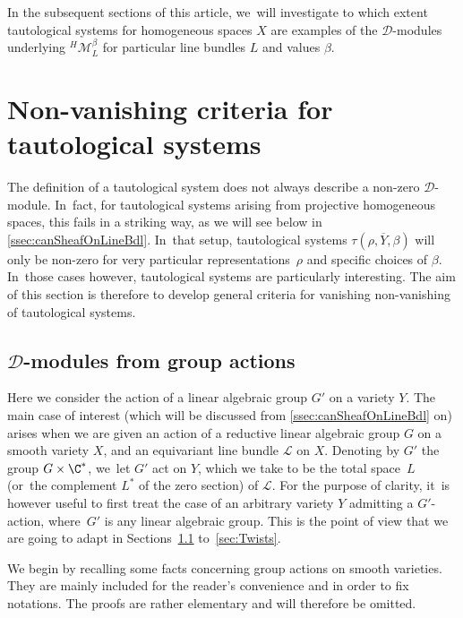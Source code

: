 \documentclass[JEP,XML,SOM,Unicode,published]{cedram}
\begin{document}
In the subsequent sections of this article, we~will investigate to which extent tautological systems for homogeneous spaces $X$ are examples of the $\mathscr D$\nobreakdash-mod\-ules underlying ${}^{H\!}\mathcal M_L^\beta$ for particular line bundles $L$ and values $\beta$.

\section{Non-vanishing criteria for tautological systems} \label{sec:nonVanishingCriteria}

The definition of a tautological system does not always describe a non-zero $\mathscr D$\nobreakdash-mod\-ule. In~fact, for tautological systems arising from projective homogeneous spaces, this fails in a striking way, as we will see below in \cref{ssec:canSheafOnLineBdl}. In~that setup, tautological systems $\tau(\rho,\overline{Y},\beta)$ will only be non-zero for very particular representations~$\rho$ and specific choices of $\beta$. In~those cases however, tautological systems are particularly interesting.
The aim of this section is therefore to develop general criteria for vanishing \resp non-vanishing of tautological systems.

\subsection{\texorpdfstring{$\mathscr D$}{D}-modules from group actions} \label{ssec:VFfromGroupActions}

Here we consider the action of a linear algebraic group $G'$ on a variety $Y$.
The main case of interest (which will be discussed from \cref{ssec:canSheafOnLineBdl} on)
arises when we are given an action of a reductive linear algebraic group $G$ on a smooth variety $X$, and an equivariant line bundle $\mathscr{L}$ on $X$. Denoting by $G'$ the group $G \times \C^*$, we~let $G'$ act on $Y$, which we take to be the total space~$L$ (or~the complement $L^*$ of the zero section) of $\mathscr{L}$. For the purpose of clarity, it~is however useful to first treat the case of an arbitrary variety $Y$ admitting a $G'$-action, where~$G'$ is any linear algebraic group. This is the point of view that we are going to adapt in Sections~\ref{ssec:VFfromGroupActions} to~\ref{sec:Twists}.

We begin by recalling some facts concerning group actions on smooth varieties. They are mainly included for the reader's convenience and in order to fix notations. The proofs are rather elementary and will therefore be omitted.
\end{document}
